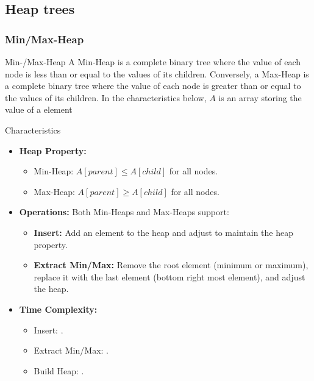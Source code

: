 \newpage
\subsection{Heap trees}
\label{sec:heap-trees}
\subsubsection{Min/Max-Heap}
\begin{definition}[]{Min-/Max-Heap}
    A Min-Heap is a complete binary tree where the value of each node is less than or equal to the values of its children.
    Conversely, a Max-Heap is a complete binary tree where the value of each node is greater than or equal to the values of its children.
    In the characteristics below, $A$ is an array storing the value of a element
\end{definition}

\begin{properties}[]{Characteristics}
    \begin{itemize}
        \item \textbf{Heap Property:}
              \begin{itemize}
                  \item Min-Heap: $A[parent] \leq A[child]$ for all nodes.
                  \item Max-Heap: $A[parent] \geq A[child]$ for all nodes.
              \end{itemize}
        \item \textbf{Operations:} Both Min-Heaps and Max-Heaps support:
              \begin{itemize}
                  \item \textbf{Insert:} Add an element to the heap and adjust to maintain the heap property.
                  \item \textbf{Extract Min/Max:} Remove the root element (minimum or maximum), replace it with the last element (bottom right most element), and adjust the heap.
              \end{itemize}
        \item \textbf{Time Complexity:}
              \begin{itemize}
                  \item Insert: .
                  \item Extract Min/Max: .
                  \item Build Heap: .
              \end{itemize}
    \end{itemize}
\end{properties}


